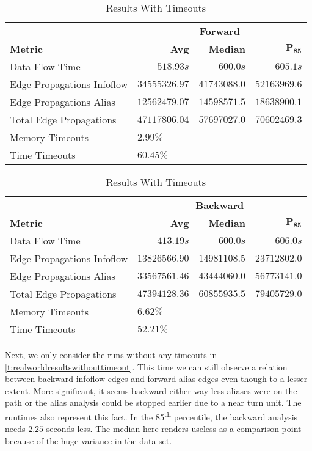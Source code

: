 \documentclass[../draft.tex]{subfiles}
\begin{document}
    \begin{table}[ht]
        \centering
        \begin{tabular}{l | r | r | r}
            & \multicolumn{3}{c}{\textbf{Forward}}\\
            \textbf{Metric} & \textbf{Avg} & \textbf{Median} & $\mathbf{P_{85}}$\\
            \hline\hline
            Data Flow Time & $518.93s$ & $600.0s$ & $605.1s$\\
            \hline
            Edge Propagations Infoflow & $34555326.97$ & $41743088.0$ & $52163969.6$\\
            Edge Propagations Alias & $12562479.07$ & $14598571.5$ & $18638900.1$\\
            Total Edge Propagations & $47117806.04$ & $57697027.0$ & $70602469.3$\\
            \hline\hline
            Memory Timeouts & \multicolumn{3}{l}{$2.99\%$}\\
            Time Timeouts & \multicolumn{3}{l}{$60.45\%$}\\
        \end{tabular}
        \bigbreak
        \begin{tabular}{l | r | r | r}
            & \multicolumn{3}{c}{\textbf{Backward}}\\
            \textbf{Metric} & \textbf{Avg} & \textbf{Median} & $\mathbf{P_{85}}$\\
            \hline\hline
            Data Flow Time & $413.19s$ & $600.0s$ & $606.0s$\\
            \hline
            Edge Propagations Infoflow & $13826566.90$ & $14981108.5$ & $23712802.0$\\
            Edge Propagations Alias & $33567561.46$ & $43444060.0$ & $56773141.0$\\
            Total Edge Propagations & $47394128.36$ & $60855935.5$ & $79405729.0$\\
            \hline\hline
            Memory Timeouts & \multicolumn{3}{l}{$6.62\%$}\\
            Time Timeouts & \multicolumn{3}{l}{$52.21\%$}\\
        \end{tabular}
        \caption{Results With Timeouts}
        \label{t:realworldresults}
    \end{table}

    Next, we only consider the runs without any timeouts in \autoref{t:realworldresultswithouttimeout}. 
    This time we can still observe a relation between backward infoflow edges and forward alias edges even though to a lesser extent. 
    More significant, it seems backward either way less aliases were on the path or the alias analysis could be stopped earlier due to a near turn unit.
    The runtimes also represent this fact. In the 85\textsuperscript{th} percentile, the backward analysis needs $2.25$ seconds less. 
    The median here renders useless as a comparison point because of the huge variance in the data set.
\end{document}
